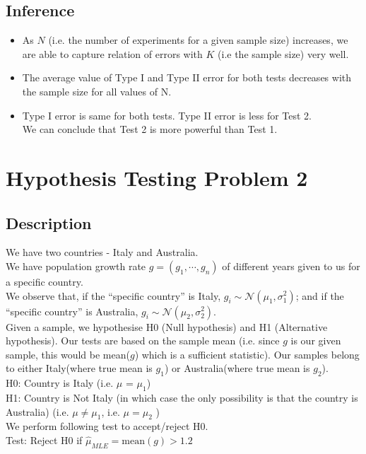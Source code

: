\documentclass[fleqn, 11pt]{article}
\begin{document}
\subsection{Inference}
\begin{itemize}
    \item As $N$ (i.e. the number of experiments for a given sample size) increases, we are able to capture relation of errors with $K$ (i.e the sample size) very well.
    \item The average value of Type I and Type II error for both tests decreases with the sample size for all values of N.
    \item Type I error is same for both tests. Type II error is less for Test 2. \\
          We can conclude that Test 2 is more powerful than Test 1.
\end{itemize}


\newpage
\section{Hypothesis Testing Problem 2}
\setcounter{figure}{0}
\subsection{Description}
We have two countries - Italy and Australia. \\
We have population growth rate $g = (g_1, \cdots ,g_n)$ of different years given to us for a specific country. \\
We observe that, if the ``specific country'' is Italy, $g_i \sim \mathcal{N}(\mu_1, \sigma_1^2)$; and if the ``specific country'' is Australia, $g_i \sim \mathcal{N}(\mu_2, \sigma_2^2)$. \\
Given a sample, we hypothesise H0 (Null hypothesis) and H1 (Alternative hypothesis). Our tests are based on the sample mean (i.e. since $g$ is our given sample, this would be mean($g$) which is a sufficient statistic). Our samples belong to either Italy(where true mean is $g_1$) or Australia(where true mean is $g_2$).   \\
H0: Country is Italy (i.e. $\mu$ = $\mu_1$) \\
H1: Country is Not Italy (in which case the only possibility is that the country is Australia) (i.e. $\mu \neq \mu_1$, i.e.  $\mu = \mu_2$  ) \\
We perform following test to accept/reject H0. \\
Test: Reject H0 if $\hat{\mu}_{MLE} = \mathrm{mean}(g) > 1.2$
\end{document}
